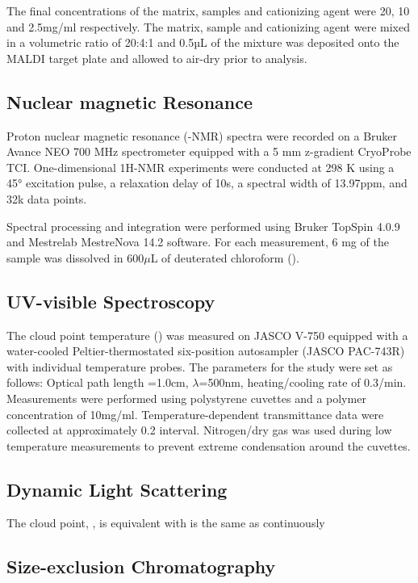 The final concentrations of the matrix, samples and cationizing agent were 20, 10 and 2.5mg/ml respectively. The matrix, sample and cationizing agent were mixed in a volumetric ratio of 20:4:1 and 0.5µL of the mixture was  deposited onto the MALDI target plate and allowed to air-dry prior to analysis.


\subsection{Nuclear magnetic Resonance}
Proton nuclear magnetic resonance (-NMR) spectra were recorded on a Bruker Avance NEO 700 MHz spectrometer equipped with a 5 mm z-gradient CryoProbe TCI. One-dimensional 1H-NMR experiments were conducted at 298 K using a \ang{45} excitation pulse, a relaxation delay of 10s, a spectral width of 13.97ppm, and 32k data points.

Spectral processing and integration were performed using Bruker TopSpin 4.0.9 and Mestrelab MestreNova 14.2 software. For each measurement, 6 mg of the sample was dissolved in 600$\mu$L of deuterated chloroform ().
\subsection{UV-visible Spectroscopy}
The cloud point temperature (\Tcp) was measured on JASCO V-750 equipped with a water-cooled Peltier-thermostated six-position autosampler (JASCO PAC-743R) with individual temperature probes. The parameters for the study were set as follows: Optical path length =1.0cm, $\lambda$=500nm, heating/cooling rate of 0.3\degc/min. Measurements were performed using polystyrene cuvettes and a polymer concentration of 10mg/ml. Temperature-dependent transmittance data were collected at approximately 0.2\degc{} interval.
Nitrogen/dry gas was used during low temperature measurements to prevent extreme condensation around the cuvettes.  
\subsection{Dynamic Light Scattering}
The cloud point, \Tcp{}, is equivalent with \HNMR{} is the same as continuously
\subsection{Size-exclusion Chromatography}




